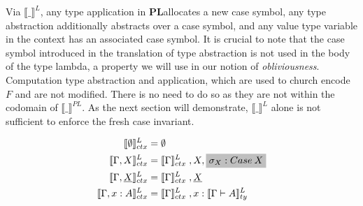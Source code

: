 \documentclass[acmsmall]{acmart}
\newcommand{\den}[1]{\llbracket #1\rrbracket}
\newcommand{\pl}{$\mathbf{PL}$}
\begin{document}
Via $\den{\_}^L$, any type application in \pl\;allocates a new case symbol, any type abstraction additionally abstracts over a case symbol, and any value type variable in the context has an associated case symbol. It is crucial to note that the case symbol introduced in the translation of type abstraction is not used in the body of the type lambda, a property we will use in our notion of \textit{obliviousness}. Computation type abstraction and application, which are used to church encode $F$ and are not modified. There is no need to do so as they are not within the codomain of $\den{\_}^{PL}$. As the next section will demonstrate, $\den{\_}^L$ alone is not sufficient to enforce the fresh case invariant. 

\begin{figure}[H]
  \centering
  \scriptsize
  \begin{align*}
\den{\emptyset }^L_{ctx} =&\; \emptyset \\
\den{\Gamma,X  }^L_{ctx} =&\; \den{\Gamma }^L_{ctx} \;, X,\colorbox{lightgray}{$\sigma_X: Case\:X$}\\
\den{\Gamma,\underline{X}  }^L_{ctx} =&\; \den{\Gamma }^L_{ctx}\; , \underline{X}\\
\den{\Gamma, x : A }^L_{ctx} =&\; \den{\Gamma }^L_{ctx}\; , x : \den{\Gamma \vdash A}^L_{ty}\\
\end{align*}


\end{figure}
\end{document}
